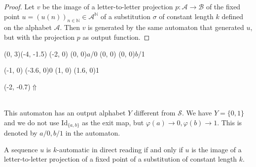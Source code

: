 \documentclass{article}
\begin{document}
\begin{proof} Let $v$ be the image of a letter-to-letter
projection $p: \mathcal{A} \to \mathcal{B}$ of the fixed point
$u = (u(n))_{n \in \mathbb{N}} \in \mathcal{A}^\mathbb{N}$ of a substitution
$\sigma$ of constant length $k$ defined on the alphabet $\mathcal{A}$. Then
$v$ is generated by the same automaton that generated $u$, but with the
projection $p$ as output function. 
\end{proof}

\begin{example}\label{ex:exit}\end{example}
\begin{graph}(0, 3)(-4, -1.5)
  (-2, 0) (0, 0){$a$/0}
  (0, 0)  (0, 0){$b$/1}

  (-1, 0) \freetext(-3.6, 0){0}
   
   
  (1, 0) \freetext(1.6, 0){1}

  \freetext(-2, -0.7){$\Uparrow$}
\end{graph}\\
This automaton has an output alphabet $Y$ different from $\mathcal{S}$. We 
have $Y = \{0, 1\}$ and we do not use Id$_{\{a, b\}}$ as the exit map, but
$\varphi(a) \to 0, \varphi(b) \to 1$. This is denoted by
$a/0, b/1$ in the automaton.

\begin{theorem} \label{thm:directreading}
A sequence $u$ is $k$-automatic in direct reading if and only if $u$ is the 
image of a letter-to-letter projection of a fixed point of a substitution of 
constant length $k$.
\end{theorem} 
\end{document}
